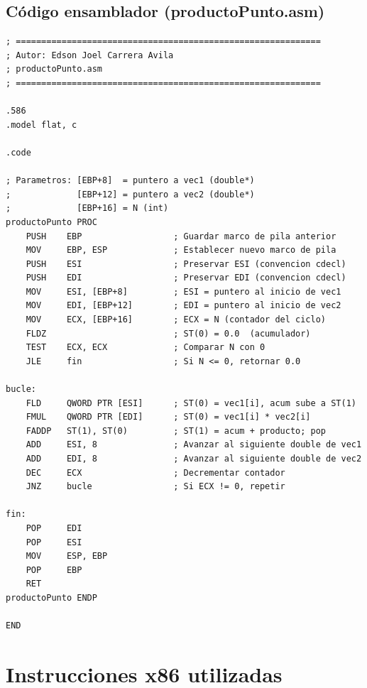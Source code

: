 \documentclass[12pt, letterpaper]{article}
\begin{document}
\subsection{Código ensamblador (productoPunto.asm)}

\begin{lstlisting}[language=MASM, caption={\texttt{productoPunto.asm} --- Cálculo del producto punto con la FPU}]
; ============================================================
; Autor: Edson Joel Carrera Avila
; productoPunto.asm
; ============================================================

.586
.model flat, c

.code

; Parametros: [EBP+8]  = puntero a vec1 (double*)
;             [EBP+12] = puntero a vec2 (double*)
;             [EBP+16] = N (int)
productoPunto PROC
    PUSH    EBP                  ; Guardar marco de pila anterior
    MOV     EBP, ESP             ; Establecer nuevo marco de pila
    PUSH    ESI                  ; Preservar ESI (convencion cdecl)
    PUSH    EDI                  ; Preservar EDI (convencion cdecl)
    MOV     ESI, [EBP+8]         ; ESI = puntero al inicio de vec1
    MOV     EDI, [EBP+12]        ; EDI = puntero al inicio de vec2
    MOV     ECX, [EBP+16]        ; ECX = N (contador del ciclo)
    FLDZ                         ; ST(0) = 0.0  (acumulador)
    TEST    ECX, ECX             ; Comparar N con 0
    JLE     fin                  ; Si N <= 0, retornar 0.0

bucle:
    FLD     QWORD PTR [ESI]      ; ST(0) = vec1[i], acum sube a ST(1)
    FMUL    QWORD PTR [EDI]      ; ST(0) = vec1[i] * vec2[i]
    FADDP   ST(1), ST(0)         ; ST(1) = acum + producto; pop
    ADD     ESI, 8               ; Avanzar al siguiente double de vec1
    ADD     EDI, 8               ; Avanzar al siguiente double de vec2
    DEC     ECX                  ; Decrementar contador
    JNZ     bucle                ; Si ECX != 0, repetir

fin:
    POP     EDI
    POP     ESI
    MOV     ESP, EBP
    POP     EBP
    RET
productoPunto ENDP

END
\end{lstlisting}

\section{Instrucciones x86 utilizadas}
\end{document}
